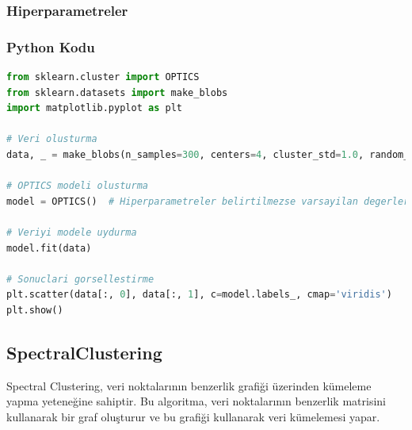 \subsubsection{Hiperparametreler}

\begin{table}[h]
\centering
{\scriptsize\renewcommand{\arraystretch}{0.4}
{}}
\end{table}

\subsubsection{Python Kodu}

\begin{lstlisting}[language=Python, caption=Scikit-learn'de OPTICS örneği.]
from sklearn.cluster import OPTICS
from sklearn.datasets import make_blobs
import matplotlib.pyplot as plt

# Veri olusturma
data, _ = make_blobs(n_samples=300, centers=4, cluster_std=1.0, random_state=42)

# OPTICS modeli olusturma
model = OPTICS()  # Hiperparametreler belirtilmezse varsayilan degerler kullanilir.

# Veriyi modele uydurma
model.fit(data)

# Sonuclari gorsellestirme
plt.scatter(data[:, 0], data[:, 1], c=model.labels_, cmap='viridis')
plt.show()
\end{lstlisting}

\newpage

\subsection{SpectralClustering}
Spectral Clustering, veri noktalarının benzerlik grafiği üzerinden kümeleme yapma yeteneğine sahiptir. Bu algoritma, veri noktalarının benzerlik matrisini kullanarak bir graf oluşturur ve bu grafiği kullanarak veri kümelemesi yapar.

